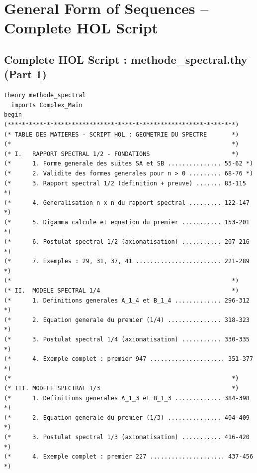 \documentclass[a4paper,11pt]{article}
\begin{document}
\newpage
\section{General Form of Sequences -- Complete HOL Script}

\subsection{Complete HOL Script : methode\_spectral.thy (Part 1)}

\begin{holcode}[title={\textcolor{white}{File: methode\_spectral.thy -- Part 1/4}}]
\begin{lstlisting}
theory methode_spectral
  imports Complex_Main
begin
(****************************************************************)
(* TABLE DES MATIERES - SCRIPT HOL : GEOMETRIE DU SPECTRE       *)
(*                                                              *)
(* I.   RAPPORT SPECTRAL 1/2 - FONDATIONS                       *)
(*      1. Forme generale des suites SA et SB ............... 55-62 *)
(*      2. Validite des formes generales pour n > 0 ......... 68-76 *)
(*      3. Rapport spectral 1/2 (definition + preuve) ....... 83-115 *)
(*      4. Generalisation n x n du rapport spectral ......... 122-147 *)
(*      5. Digamma calcule et equation du premier ........... 153-201 *)
(*      6. Postulat spectral 1/2 (axiomatisation) ........... 207-216 *)
(*      7. Exemples : 29, 31, 37, 41 ........................ 221-289 *)
(*                                                              *)
(* II.  MODELE SPECTRAL 1/4                                     *)
(*      1. Definitions generales A_1_4 et B_1_4 ............. 296-312 *)
(*      2. Equation generale du premier (1/4) ............... 318-323 *)
(*      3. Postulat spectral 1/4 (axiomatisation) ........... 330-335 *)
(*      4. Exemple complet : premier 947 ..................... 351-377 *)
(*                                                              *)
(* III. MODELE SPECTRAL 1/3                                     *)
(*      1. Definitions generales A_1_3 et B_1_3 ............. 384-398 *)
(*      2. Equation generale du premier (1/3) ............... 404-409 *)
(*      3. Postulat spectral 1/3 (axiomatisation) ........... 416-420 *)
(*      4. Exemple complet : premier 227 ..................... 437-456 *)

\end{lstlisting}
\end{holcode}
\end{document}
